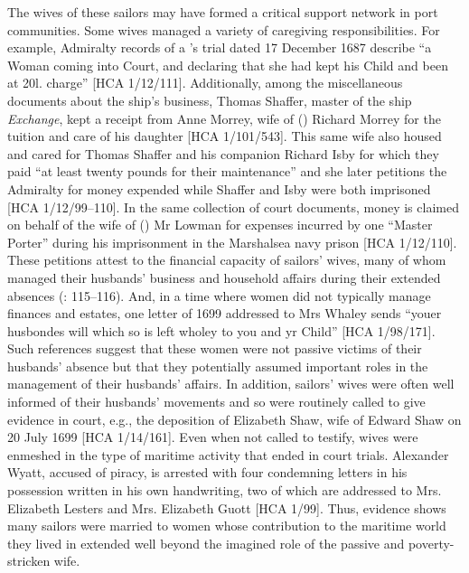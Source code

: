 The wives of these sailors may have formed a critical support network in port communities. Some wives managed a variety of caregiving responsibilities. For example, Admiralty records of a ’s trial dated 17 December {1687} describe “a Woman coming into Court, and declaring that she had kept his Child and been at 20l. charge” [HCA 1/12/111]. Additionally, among the miscellaneous documents about the ship’s business, Thomas Shaffer, master of the ship \textit{Exchange}, kept a receipt from Anne Morrey, wife of () Richard Morrey for the tuition and care of his daughter [HCA 1/101/543]. This same wife also housed and cared for Thomas Shaffer and his companion Richard Isby for which they paid “at least twenty pounds for their maintenance” and she later petitions the Admiralty for money expended while Shaffer and Isby were both imprisoned [HCA 1/12/99–110]. In the same collection of court documents, money is claimed on behalf of the wife of () Mr Lowman for expenses incurred by one “Master Porter” during his imprisonment in the Marshalsea navy prison [HCA 1/12/110].  These petitions attest to the financial capacity of sailors’ wives, many of whom managed their husbands’ business and household affairs during their extended absences (\citealt{Jarvis2010}: 115–116). And, in a time where women did not typically manage finances and estates, one letter of 1699 addressed to Mrs Whaley sends “youer husbondes will which so is left wholey to you and yr Child” [HCA 1/98/171]. Such references suggest that these women were not passive victims of their husbands’ absence but that they potentially assumed important roles in the management of their husbands’ affairs. In addition, sailors’ wives were often well informed of their husbands’ movements and so were routinely called to give evidence in court, e.g., the deposition of Elizabeth Shaw, wife of  Edward Shaw on 20 July {1699} [HCA 1/14/161]. Even when not called to testify, wives were enmeshed in the type of maritime activity that ended in court trials. Alexander Wyatt, accused of piracy, is arrested with four condemning letters in his possession written in his own handwriting, two of which are addressed to Mrs. Elizabeth Lesters and Mrs. Elizabeth Guott [HCA 1/99]. Thus, evidence shows many sailors were married to women whose contribution to the maritime world they lived in extended well beyond the imagined role of the passive and poverty-stricken wife. 

